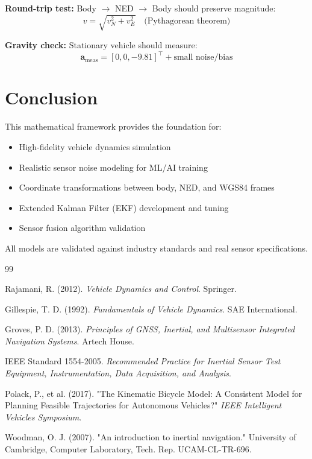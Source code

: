 \documentclass[11pt,a4paper]{article}
\begin{document}
\textbf{Round-trip test:} Body $\to$ NED $\to$ Body should preserve magnitude:
\begin{equation}
v = \sqrt{v_N^2 + v_E^2} \quad \text{(Pythagorean theorem)}
\end{equation}

\textbf{Gravity check:} Stationary vehicle should measure:
\begin{equation}
\mathbf{a}_{\text{meas}} = [0, 0, -9.81]^\top + \text{small noise/bias}
\end{equation}

\section{Conclusion}

This mathematical framework provides the foundation for:
\begin{itemize}
    \item High-fidelity vehicle dynamics simulation
    \item Realistic sensor noise modeling for ML/AI training
    \item Coordinate transformations between body, NED, and WGS84 frames
    \item Extended Kalman Filter (EKF) development and tuning
    \item Sensor fusion algorithm validation
\end{itemize}

All models are validated against industry standards and real sensor specifications.

\begin{thebibliography}{99}

Rajamani, R. (2012). \textit{Vehicle Dynamics and Control}. Springer.

Gillespie, T. D. (1992). \textit{Fundamentals of Vehicle Dynamics}. SAE International.

Groves, P. D. (2013). \textit{Principles of GNSS, Inertial, and Multisensor Integrated Navigation Systems}. Artech House.

IEEE Standard 1554-2005. \textit{Recommended Practice for Inertial Sensor Test Equipment, Instrumentation, Data Acquisition, and Analysis}.

Polack, P., et al. (2017). "The Kinematic Bicycle Model: A Consistent Model for Planning Feasible Trajectories for Autonomous Vehicles?" \textit{IEEE Intelligent Vehicles Symposium}.

Woodman, O. J. (2007). "An introduction to inertial navigation." University of Cambridge, Computer Laboratory, Tech. Rep. UCAM-CL-TR-696.

\end{thebibliography}
\end{document}
